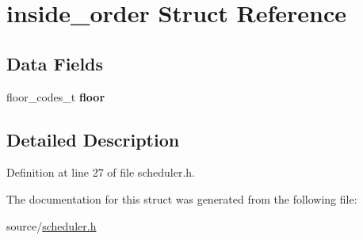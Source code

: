 \hypertarget{structinside__order}{}\section{inside\+\_\+order Struct Reference}
\label{structinside__order}
\subsection*{Data Fields}
\begin{DoxyCompactItemize}
\item 
\mbox{\label{structinside__order_a5f816e91e84a8bd27ac2a179c43691dc}} 
floor\+\_\+codes\+\_\+t {\bfseries floor}
\end{DoxyCompactItemize}


\subsection{Detailed Description}


Definition at line 27 of file scheduler.\+h.



The documentation for this struct was generated from the following file\+:\begin{DoxyCompactItemize}
\item 
source/\hyperlink{scheduler_8h}{scheduler.\+h}\end{DoxyCompactItemize}
